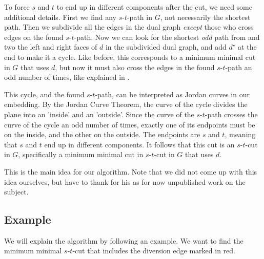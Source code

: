 To force $s$ and $t$ to end up in different components after the cut, we need some additional details. First we find any $s$-$t$-path in $G$, not necessarily the shortest path. Then we subdivide all the edges in the dual graph \emph{except} those who cross edges on the found $s$-$t$-path. Now we can look for the shortest \emph{odd} path from and two the left and right faces of $d$ in the subdivided dual graph, and add $d^\star$ at the end to make it a cycle. Like before, this corresponds to a minimum minimal cut in $G$ that uses $d$, but now it must also cross the edges in the found $s$-$t$-path an odd number of times, like explained in . 

This cycle, and the found $s$-$t$-path, can be interpreted as Jordan curves in our embedding. By the Jordan Curve Theorem, the curve of the cycle divides the plane into an 'inside' and an 'outside'. Since the curve of the $s$-$t$-path crosses the curve of the cycle an odd number of times, exactly one of its endpoints must be on the inside, and the other on the outside. The endpoints are $s$ and $t$, meaning that $s$ and $t$ end up in different components. It follows that this cut is an $s$-$t$-cut in $G$, specifically a minimum minimal cut in $s$-$t$-cut in $G$ that uses $d$.

This is the main idea for our algorithm. Note that we did not come up with this idea ourselves, but have to thank \cite{source:pål} for his as for now unpublished work on the subject.

\subsection{Example}
\label{subsection:network-diversion-example}
We will explain the algorithm by following an example. We want to find the minimum minimal $s$-$t$-cut that includes the diversion edge marked in red. 

\begin{center}
\end{center}

